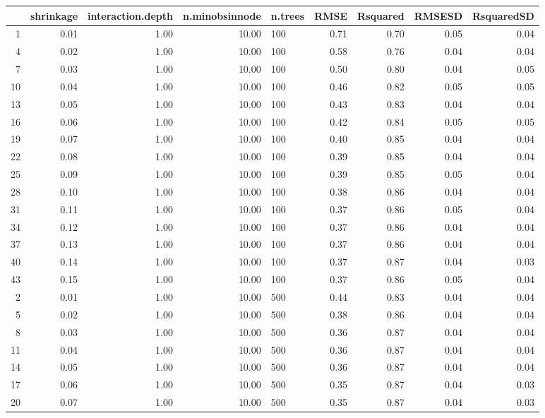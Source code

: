 \begin{table}[ht]
\centering
\begin{tabular}{rrrrlrrrr}
  \hline
 & shrinkage & interaction.depth & n.minobsinnode & n.trees & RMSE & Rsquared & RMSESD & RsquaredSD \\ 
  \hline
1 & 0.01 & 1.00 & 10.00 & 100 & 0.71 & 0.70 & 0.05 & 0.04 \\ 
  4 & 0.02 & 1.00 & 10.00 & 100 & 0.58 & 0.76 & 0.04 & 0.04 \\ 
  7 & 0.03 & 1.00 & 10.00 & 100 & 0.50 & 0.80 & 0.04 & 0.05 \\ 
  10 & 0.04 & 1.00 & 10.00 & 100 & 0.46 & 0.82 & 0.05 & 0.05 \\ 
  13 & 0.05 & 1.00 & 10.00 & 100 & 0.43 & 0.83 & 0.04 & 0.04 \\ 
  16 & 0.06 & 1.00 & 10.00 & 100 & 0.42 & 0.84 & 0.05 & 0.05 \\ 
  19 & 0.07 & 1.00 & 10.00 & 100 & 0.40 & 0.85 & 0.04 & 0.04 \\ 
  22 & 0.08 & 1.00 & 10.00 & 100 & 0.39 & 0.85 & 0.04 & 0.04 \\ 
  25 & 0.09 & 1.00 & 10.00 & 100 & 0.39 & 0.85 & 0.05 & 0.04 \\ 
  28 & 0.10 & 1.00 & 10.00 & 100 & 0.38 & 0.86 & 0.04 & 0.04 \\ 
  31 & 0.11 & 1.00 & 10.00 & 100 & 0.37 & 0.86 & 0.05 & 0.04 \\ 
  34 & 0.12 & 1.00 & 10.00 & 100 & 0.37 & 0.86 & 0.04 & 0.04 \\ 
  37 & 0.13 & 1.00 & 10.00 & 100 & 0.37 & 0.86 & 0.04 & 0.04 \\ 
  40 & 0.14 & 1.00 & 10.00 & 100 & 0.37 & 0.87 & 0.04 & 0.03 \\ 
  43 & 0.15 & 1.00 & 10.00 & 100 & 0.37 & 0.86 & 0.05 & 0.04 \\ 
  2 & 0.01 & 1.00 & 10.00 & 500 & 0.44 & 0.83 & 0.04 & 0.04 \\ 
  5 & 0.02 & 1.00 & 10.00 & 500 & 0.38 & 0.86 & 0.04 & 0.04 \\ 
  8 & 0.03 & 1.00 & 10.00 & 500 & 0.36 & 0.87 & 0.04 & 0.04 \\ 
  11 & 0.04 & 1.00 & 10.00 & 500 & 0.36 & 0.87 & 0.04 & 0.04 \\ 
  14 & 0.05 & 1.00 & 10.00 & 500 & 0.36 & 0.87 & 0.04 & 0.04 \\ 
  17 & 0.06 & 1.00 & 10.00 & 500 & 0.35 & 0.87 & 0.04 & 0.03 \\ 
  20 & 0.07 & 1.00 & 10.00 & 500 & 0.35 & 0.87 & 0.04 & 0.03 \\ 

\end{tabular}
\end{table}
